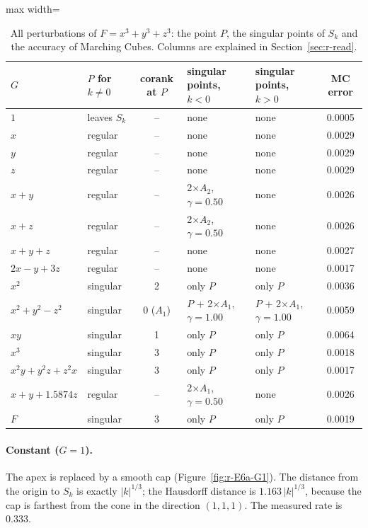 \documentclass[12pt, a4paper]{article}
\theoremstyle{plain}
\theoremstyle{definition}
\theoremstyle{remark}
\theoremstyle{definition}
\begin{document}
\begin{table}[!h]
\centering
\footnotesize
\begin{adjustbox}{max width=\textwidth}
\begin{tabular}{l l c l l c}
\toprule
$G$ & $P$ for $k\neq0$ & corank at $P$ & singular points, $k<0$ & singular points, $k>0$ & MC error \\
\midrule
$1$ & leaves $S_k$ & -- & none & none & 0.0005 \\
$x$ & regular & -- & none & none & 0.0029 \\
$y$ & regular & -- & none & none & 0.0029 \\
$z$ & regular & -- & none & none & 0.0029 \\
$x+y$ & regular & -- & 2$\times$$A_2$, $\gamma=0.50$ & none & 0.0026 \\
$x+z$ & regular & -- & 2$\times$$A_2$, $\gamma=0.50$ & none & 0.0026 \\
$x+y+z$ & regular & -- & none & none & 0.0027 \\
$2x-y+3z$ & regular & -- & none & none & 0.0017 \\
$x^2$ & singular & 2 & only $P$ & only $P$ & 0.0036 \\
$x^2+y^2-z^2$ & singular & 0 ($A_1$) & $P$ + 2$\times$$A_1$, $\gamma=1.00$ & $P$ + 2$\times$$A_1$, $\gamma=1.00$ & 0.0059 \\
$xy$ & singular & 1 & only $P$ & only $P$ & 0.0064 \\
$x^3$ & singular & 3 & only $P$ & only $P$ & 0.0018 \\
$x^2y+y^2z+z^2x$ & singular & 3 & only $P$ & only $P$ & 0.0017 \\
$x+y+1.5874z$ & regular & -- & 2$\times$$A_1$, $\gamma=0.50$ & none & 0.0026 \\
$F$ & singular & 3 & only $P$ & only $P$ & 0.0019 \\
\bottomrule
\end{tabular}
\end{adjustbox}
\caption[Singular points for $x^3+y^3+z^3$]{All perturbations of $F=x^3+y^3+z^3$: the point $P$, the singular points of $S_k$ and the accuracy of Marching Cubes. Columns are explained in Section~\ref{sec:r-read}.}
\label{tab:r-E6a-points}
\end{table}
\paragraph{Constant ($G=1$).} The apex is replaced by a smooth cap
(Figure~\ref{fig:r-E6a-G1}). The distance from the origin to $S_k$ is exactly
$|k|^{1/3}$; the Hausdorff distance is $1.163\,|k|^{1/3}$, because the cap is
farthest from the cone in the direction $(1,1,1)$. The measured rate is $0.333$.
\end{document}
